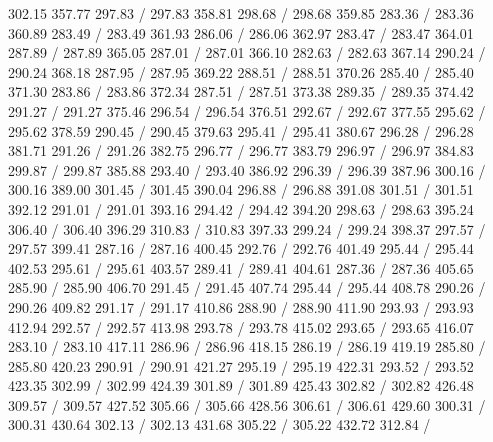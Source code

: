 { 302.15 357.77 297.83 /
 297.83 358.81 298.68 /
 298.68 359.85 283.36 /
 283.36 360.89 283.49 /
 283.49 361.93 286.06 /
 286.06 362.97 283.47 /
 283.47 364.01 287.89 /
 287.89 365.05 287.01 /
 287.01 366.10 282.63 /
 282.63 367.14 290.24 /
 290.24 368.18 287.95 /
 287.95 369.22 288.51 /
 288.51 370.26 285.40 /
 285.40 371.30 283.86 /
 283.86 372.34 287.51 /
 287.51 373.38 289.35 /
 289.35 374.42 291.27 /
 291.27 375.46 296.54 /
 296.54 376.51 292.67 /
 292.67 377.55 295.62 /
 295.62 378.59 290.45 /
 290.45 379.63 295.41 /
 295.41 380.67 296.28 /
 296.28 381.71 291.26 /
 291.26 382.75 296.77 /
 296.77 383.79 296.97 /
 296.97 384.83 299.87 /
 299.87 385.88 293.40 /
 293.40 386.92 296.39 /
 296.39 387.96 300.16 /
 300.16 389.00 301.45 /
 301.45 390.04 296.88 /
 296.88 391.08 301.51 /
 301.51 392.12 291.01 /
 291.01 393.16 294.42 /
 294.42 394.20 298.63 /
 298.63 395.24 306.40 /
 306.40 396.29 310.83 /
 310.83 397.33 299.24 /
 299.24 398.37 297.57 /
 297.57 399.41 287.16 /
 287.16 400.45 292.76 /
 292.76 401.49 295.44 /
 295.44 402.53 295.61 /
 295.61 403.57 289.41 /
 289.41 404.61 287.36 /
 287.36 405.65 285.90 /
 285.90 406.70 291.45 /
 291.45 407.74 295.44 /
 295.44 408.78 290.26 /
 290.26 409.82 291.17 /
 291.17 410.86 288.90 /
 288.90 411.90 293.93 /
 293.93 412.94 292.57 /
 292.57 413.98 293.78 /
 293.78 415.02 293.65 /
 293.65 416.07 283.10 /
 283.10 417.11 286.96 /
 286.96 418.15 286.19 /
 286.19 419.19 285.80 /
 285.80 420.23 290.91 /
 290.91 421.27 295.19 /
 295.19 422.31 293.52 /
 293.52 423.35 302.99 /
 302.99 424.39 301.89 /
 301.89 425.43 302.82 /
 302.82 426.48 309.57 /
 309.57 427.52 305.66 /
 305.66 428.56 306.61 /
 306.61 429.60 300.31 /
 300.31 430.64 302.13 /
 302.13 431.68 305.22 /
 305.22 432.72 312.84 /
}
